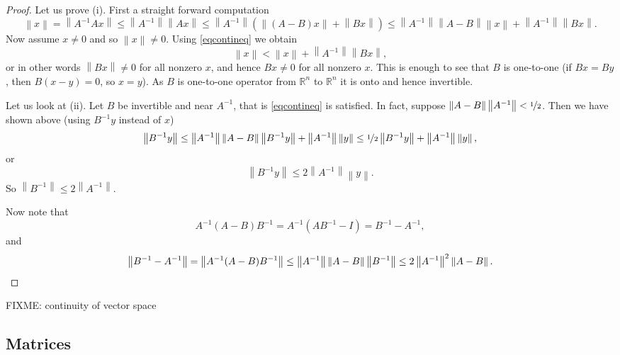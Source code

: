 \documentclass[12pt]{book}
\newcommand{\norm}[1]{\left\lVert {#1} \right\rVert}
\newcommand{\R}{{\mathbb{R}}}
\theoremstyle{plain}
\theoremstyle{remark}
\theoremstyle{definition}
\theoremstyle{exercise}
\theoremstyle{example}
\begin{document}
\begin{proof}
Let us prove (i).  First a straight forward computation
\begin{equation*}
\norm{x} =
\norm{A^{-1}Ax}
\leq
\norm{A^{-1}} \norm{Ax}
\leq
\norm{A^{-1}} ( \norm{(A-B)x} + \norm{Bx} )
\leq
\norm{A^{-1}}\norm{A-B} \norm{x} + \norm{A^{-1}}\norm{Bx} .
\end{equation*}
Now assume $x \neq 0$ and so $\norm{x} \neq 0$.
Using \eqref{eqcontineq} we obtain
\begin{equation*}
\norm{x} < \norm{x} + \norm{A^{-1}}\norm{Bx} ,
\end{equation*}
or in other words $\norm{Bx} \not= 0$ for all nonzero $x$, and hence
$Bx \not= 0$ for all nonzero $x$.  This is enough to see that
$B$ is one-to-one (if $Bx = By$, then $B(x-y) = 0$, so $x=y$).
As $B$ is one-to-one operator from $\R^n$ to $\R^n$ it is onto
and hence invertible.

Let us look at (ii).  Let $B$ be invertible and near $A^{-1}$,
that is \eqref{eqcontineq} is satisfied.  In fact, 
suppose $\norm{A-B} \norm{A^{-1}} <  \nicefrac{1}{2}$.
Then we have shown above (using $B^{-1}y$ instead of $x$)
\begin{equation*}
\norm{B^{-1}y} \leq 
\norm{A^{-1}}\norm{A-B} \norm{B^{-1}y} + \norm{A^{-1}}\norm{y}
\leq
\nicefrac{1}{2} \norm{B^{-1}y} + \norm{A^{-1}}\norm{y} ,
\end{equation*}
or
\begin{equation*}
\norm{B^{-1}y} \leq 
2\norm{A^{-1}}\norm{y} .
\end{equation*}
So
$
\norm{B^{-1}} \leq 2 \norm{A^{-1}}
$.

Now note that
\begin{equation*}
A^{-1}(A-B)B^{-1} = 
A^{-1}(AB^{-1}-I) = 
B^{-1}-A^{-1} ,
\end{equation*}
and
\begin{equation*}
\norm{B^{-1}-A^{-1}} =
\norm{A^{-1}(A-B)B^{-1}} \leq
\norm{A^{-1}}\norm{A-B}\norm{B^{-1}}
\leq
2\norm{A^{-1}}^2
\norm{A-B} . \qedhere
\end{equation*}
\end{proof}

FIXME: continuity of vector space 

\subsection{Matrices}
\end{document}
